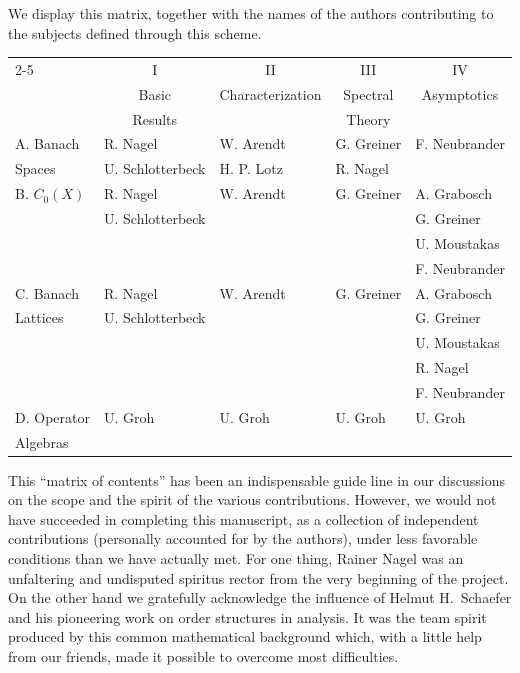  We display this matrix, together with the names of the authors contributing to the subjects defined through this scheme.
\begin{center}
\begin{tabularx}{\textwidth}{l|X|X|X|X|}
\cline{2-5}
  & \multicolumn{1}{|c|}{I} & \multicolumn{1}{|c|}{II} & \multicolumn{1}{|c|}{III} & \multicolumn{1}{|c|}{IV} \\
  & \multicolumn{1}{|c|}{Basic} & \multicolumn{1}{|c|}{Characterization} & \multicolumn{1}{|c|}{Spectral} & \multicolumn{1}{|c|}{Asymptotics} \\
  & \multicolumn{1}{|c|}{Results} & \multicolumn{1}{|c|}{} & \multicolumn{1}{|c|}{Theory} & \multicolumn{1}{|c|}{} \\
 \hline
 \multicolumn{1}{|l|}{A. Banach} & R. Nagel & W. Arendt & G. Greiner & F. Neubrander \\
 \multicolumn{1}{|l|}{Spaces} & U. Schlotterbeck & H. P. Lotz & R. Nagel & \\
 \hline
 \multicolumn{1}{|l|}{B. $C_0(X)$} & R. Nagel & W. Arendt & G. Greiner & A. Grabosch \\
 \multicolumn{1}{|l|}{} & U. Schlotterbeck & & & G. Greiner \\
 \multicolumn{1}{|l|}{} & & & & U. Moustakas \\
 \multicolumn{1}{|l|}{} & & & & F. Neubrander \\
 \hline
 \multicolumn{1}{|l|}{C. Banach} & R. Nagel & W. Arendt & G. Greiner & A. Grabosch \\
 \multicolumn{1}{|l|}{Lattices} & U. Schlotterbeck & & & G. Greiner \\
 \multicolumn{1}{|l|}{} & & & & U. Moustakas \\
 \multicolumn{1}{|l|}{} & & & & R. Nagel \\
 \multicolumn{1}{|l|}{} & & & & F. Neubrander \\
 \hline
 \multicolumn{1}{|l|}{D. Operator} & U. Groh & U. Groh & U. Groh & U. Groh \\
 \multicolumn{1}{|l|}{Algebras} & & & & \\
 \hline
 \end{tabularx}
 \end{center}
 \bigskip
 This \enquote{matrix of contents} has been an indispensable guide line in our discussions on the scope and the spirit of the various contributions. 
 However, we would not have succeeded in completing this manuscript, as a collection of independent contributions (personally accounted for by the authors), under less favorable conditions than we have actually met. 
 For one thing, Rainer Nagel was an unfaltering and undisputed spiritus rector from the very beginning of the project. 
 On the other hand we gratefully acknowledge the influence of Helmut H.~Schaefer and his pioneering work on order structures in analysis. 
 It was the team spirit produced by this common mathematical background which, with a little help from our friends, made it possible to overcome most difficulties.
 
